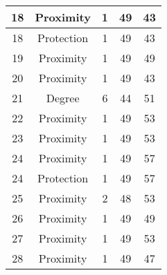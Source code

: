 \documentclass[results.tex]{subfiles}
\begin{document}
\begin{center}
\begin{tabular}{| c || c | c | c | c |}
            \hline
            18                      & Proximity                    & 1                      & 49                      & 43                   \\
            \hline
            18                      & Protection                   & 1                      & 49                      & 43                   \\
            \hline
            19                      & Proximity                    & 1                      & 49                      & 49                   \\
            \hline
            20                      & Proximity                    & 1                      & 49                      & 43                   \\
            \hline
            21                      & Degree                       & 6                      & 44                      & 51                   \\
            \hline
            22                      & Proximity                    & 1                      & 49                      & 53                   \\
            \hline
            23                      & Proximity                    & 1                      & 49                      & 53                   \\
            \hline
            24                      & Proximity                    & 1                      & 49                      & 57                   \\
            \hline
            24                      & Protection                   & 1                      & 49                      & 57                   \\
            \hline
            25                      & Proximity                    & 2                      & 48                      & 53                   \\
            \hline
            26                      & Proximity                    & 1                      & 49                      & 49                   \\
            \hline
            27                      & Proximity                    & 1                      & 49                      & 53                   \\
            \hline
            28                      & Proximity                    & 1                      & 49                      & 47                   \\

\end{tabular}
\end{center}
\end{document}
